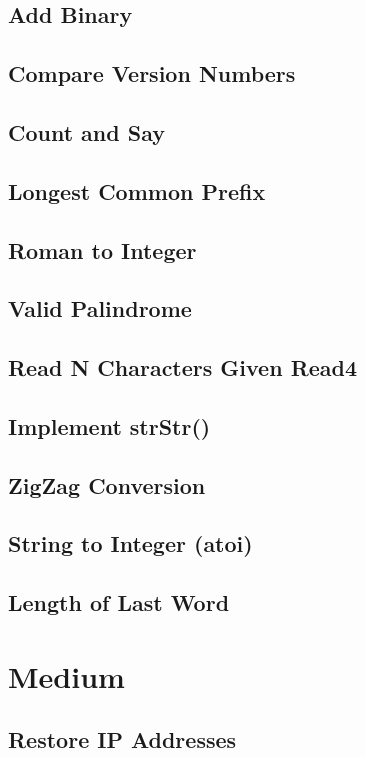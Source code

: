 \documentclass[11pt]{book}
\begin{document}
\subsection{Add Binary}
\label{sec-2-1-2}
\subsection{Compare Version Numbers}
\label{sec-2-1-3}
\subsection{Count and Say}
\label{sec-2-1-4}
\subsection{Longest Common Prefix}
\label{sec-2-1-5}
\subsection{Roman to Integer}
\label{sec-2-1-6}
\subsection{Valid Palindrome}
\label{sec-2-1-7}
\subsection{Read N Characters Given Read4}
\label{sec-2-1-8}
\subsection{Implement strStr()}
\label{sec-2-1-9}
\subsection{ZigZag Conversion}
\label{sec-2-1-10}
\subsection{String to Integer (atoi)}
\label{sec-2-1-11}
\subsection{Length of Last Word}
\label{sec-2-1-12}
\section{Medium}
\label{sec-2-2}
\subsection{Restore IP Addresses}
\label{sec-2-2-1}
\end{document}
